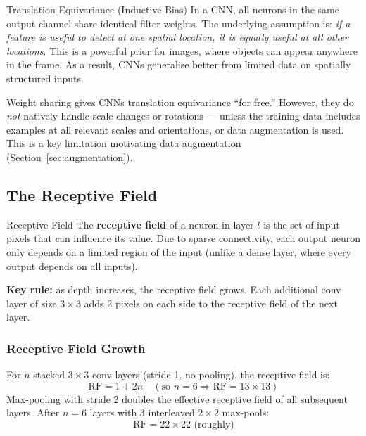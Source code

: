 \documentclass[11pt,a4paper]{article}
\newcommand{\term}[1]{\textcolor{DefGreen}{\textbf{#1}}\index{#1}}
\begin{document}
\begin{defbox}{Translation Equivariance (Inductive Bias)}
In a CNN, all neurons in the same output channel share identical filter weights. The underlying assumption is: \emph{if a feature is useful to detect at one spatial location, it is equally useful at all other locations}. This is a powerful prior for images, where objects can appear anywhere in the frame. As a result, CNNs generalise better from limited data on spatially structured inputs.
\end{defbox}

\begin{insightbox}
Weight sharing gives CNNs translation equivariance ``for free.'' However, they do \emph{not} natively handle scale changes or rotations — unless the training data includes examples at all relevant scales and orientations, or data augmentation is used. This is a key limitation motivating data augmentation (Section~\ref{sec:augmentation}).
\end{insightbox}

\subsection{The Receptive Field}
\label{sec:receptive_field}

\begin{defbox}{Receptive Field}
The \term{receptive field} of a neuron in layer $l$ is the set of input pixels that can influence its value. Due to sparse connectivity, each output neuron only depends on a limited region of the input (unlike a dense layer, where every output depends on all inputs).

\textbf{Key rule:} as depth increases, the receptive field grows. Each additional conv layer of size $3\times3$ adds 2 pixels on each side to the receptive field of the next layer.
\end{defbox}

\subsubsection{Receptive Field Growth}

For $n$ stacked $3\times3$ conv layers (stride 1, no pooling), the receptive field is:
\[
\text{RF} = 1 + 2n \quad (\text{so }n=6 \Rightarrow \text{RF} = 13\times13)
\]
Max-pooling with stride 2 doubles the effective receptive field of all subsequent layers. After $n=6$ layers with 3 interleaved $2\times2$ max-pools:
\[
\text{RF} = 22\times22 \text{ (roughly)}
\]
\end{document}
